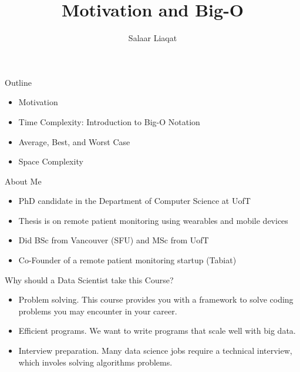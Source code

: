 \documentclass[
  ignorenonframetext,
]{beamer}
\title{Motivation and Big-O}
\author{Salaar Liaqat}
\date{}
\institute{Data Sciences Institute, UofT}
\begin{document}
\frame{\titlepage}
\ifdefined\Shaded\renewenvironment{Shaded}{\begin{tcolorbox}[boxrule=0pt, enhanced, frame hidden, borderline west={3pt}{0pt}{shadecolor}, interior hidden, sharp corners, breakable]}{\end{tcolorbox}}\fi

\begin{frame}{Outline}
\protect\hypertarget{outline}{}
\begin{itemize}
\item
  Motivation
\item
  Time Complexity: Introduction to Big-O Notation
\item
  Average, Best, and Worst Case
\item
  Space Complexity
\end{itemize}
\end{frame}

\begin{frame}{About Me}
\protect\hypertarget{about-me}{}
\begin{itemize}
\item
  PhD candidate in the Department of Computer Science at UofT
\item
  Thesis is on remote patient monitoring using wearables and mobile
  devices
\item
  Did BSc from Vancouver (SFU) and MSc from UofT
\item
  Co-Founder of a remote patient monitoring startup (Tabiat)
\end{itemize}
\end{frame}

\begin{frame}{Why should a Data Scientist take this Course?}
\protect\hypertarget{why-should-a-data-scientist-take-this-course}{}
\begin{itemize}
\item
  Problem solving. This course provides you with a framework to solve
  coding problems you may encounter in your career.
\item
  Efficient programs. We want to write programs that scale well with big
  data.
\item
  Interview preparation. Many data science jobs require a technical
  interview, which involes solving algorithms problems.
\end{itemize}
\end{frame}
\end{document}
